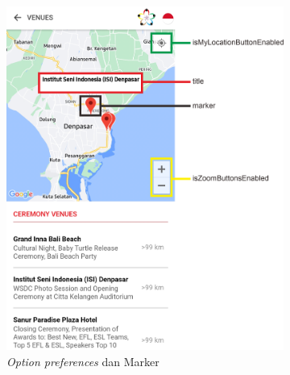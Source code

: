 \begin{itemize}
\begin{figure}[H]
     \centering
     \begin{subfigure}[b]{0.45\textwidth}
         \centering
         \includegraphics[width=\textwidth]{Gambar/VenueMapPageOption1.png}
         \caption{\textit{Option preferences} dan Marker}
         \label{fig:VenueMapPageOption1}
     \end{subfigure}
     \hspace*{0.5in}
     \begin{subfigure}[b]{0.45\textwidth}
         \centering

\end{subfigure}
\end{figure}
\end{itemize}
